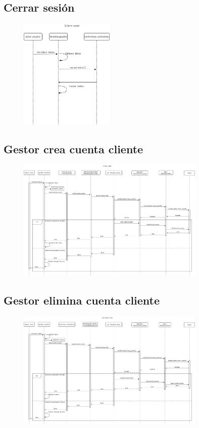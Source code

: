 \documentclass[12pt]{article}
\begin{document}
\subsection{Cerrar sesión}
\begin{figure}[H]
    \centering
    \includegraphics[width=0.4\textwidth]{2-Cerrar_sesion.png}
\end{figure}
\subsection{Gestor crea cuenta cliente}
\begin{figure}[H]
    \centering
    \includegraphics[width=0.8\textwidth]{crear_cuenta.png}
\end{figure}
\subsection{Gestor elimina cuenta cliente}
\begin{figure}[H]
    \centering
    \includegraphics[width=0.8\textwidth]{eliminar_cuenta.png}
\end{figure}
\end{document}
